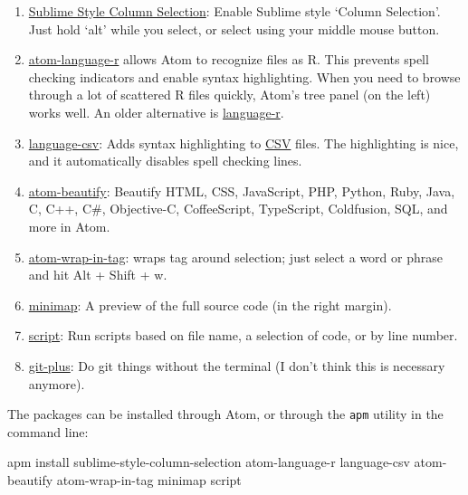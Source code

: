 \documentclass[]{book}
\newenvironment{Shaded}{\begin{snugshade}}{\end{snugshade}}
\newcommand{\FunctionTok}[1]{\textcolor[rgb]{0.00,0.00,0.00}{#1}}
\newcommand{\NormalTok}[1]{#1}
\begin{document}
\begin{itemize}
  \begin{enumerate}
  \def\labelenumi{\arabic{enumi}.}
  \item
    \href{https://atom.io/packages/Sublime-Style-Column-Selection}{Sublime Style Column Selection}: Enable Sublime style `Column Selection'. Just hold `alt' while you select, or select using your middle mouse button.
  \item
    \href{https://atom.io/packages/atom-language-r}{atom-language-r} allows Atom to recognize files as R. This prevents spell checking indicators and enable syntax highlighting. When you need to browse through a lot of scattered R files quickly, Atom's tree panel (on the left) works well. An older alternative is \href{https://atom.io/packages/language-r}{language-r}.
  \item
    \href{https://atom.io/packages/language-csv}{language-csv}: Adds syntax highlighting to \href{https://en.wikipedia.org/wiki/Comma-separated_values}{CSV} files. The highlighting is nice, and it automatically disables spell checking lines.
  \item
    \href{https://atom.io/packages/atom-beautify}{atom-beautify}: Beautify HTML, CSS, JavaScript, PHP, Python, Ruby, Java, C, C++, C\#, Objective-C, CoffeeScript, TypeScript, Coldfusion, SQL, and more in Atom.
  \item
    \href{https://atom.io/packages/atom-wrap-in-tag}{atom-wrap-in-tag}: wraps tag around selection; just select a word or phrase and hit Alt + Shift + w.
  \item
    \href{https://atom.io/packages/minimap}{minimap}: A preview of the full source code (in the right margin).
  \item
    \href{https://atom.io/packages/script}{script}: Run scripts based on file name, a selection of code, or by line number.
  \item
    \href{https://atom.io/packages/git-plus}{git-plus}: Do git things without the terminal (I don't think this is necessary anymore).
  \end{enumerate}

  The packages can be installed through Atom, or through the \texttt{apm} utility in the command line:

\begin{Shaded}
\begin{Highlighting}[]
\FunctionTok{apm}\NormalTok{ install sublime-style-column-selection atom-language-r language-csv atom-beautify atom-wrap-in-tag minimap script}
\end{Highlighting}
\end{Shaded}


\end{itemize}
\end{document}
